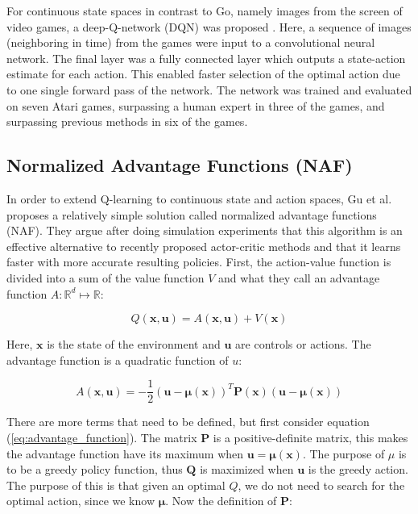 For continuous state spaces in contrast to Go, namely images from the screen of
video games, a deep-Q-network (DQN) was proposed \cite{mnih2013playing}. Here,
a sequence of images (neighboring in time) from the games were input to a
convolutional neural network. The final layer was a fully connected layer which
outputs a state-action estimate for each action. This enabled faster selection
of the optimal action due to one single forward pass of the network. The
network was trained and evaluated on seven Atari games, surpassing a human
expert in three of the games, and surpassing previous methods in six of the
games.


\subsection{Normalized Advantage Functions (NAF)}

In order to extend Q-learning to continuous state and action spaces, Gu et al.
\cite{gu2016continuous} proposes a relatively simple solution called normalized
advantage functions (NAF). They argue after doing simulation experiments that
this algorithm is an effective alternative to recently proposed actor-critic
methods and that it learns faster with more accurate resulting policies. First,
the action-value function is divided into a sum of the value function $V$ and
what they call an advantage function $A : \mathbb{R}^d \longmapsto \mathbb{R}$:

\begin{equation}
    Q(\mathbf{x}, \mathbf{u}) = A(\mathbf{x}, \mathbf{u}) + V(\mathbf{x})
\end{equation}

Here, $\mathbf{x}$ is the state of the environment and $\mathbf{u}$ are
controls or actions. The advantage function is a quadratic function of $u$:

\begin{equation}
    A(\mathbf{x}, \mathbf{u}) = -\frac{1}{2}(\mathbf{u} - \mathbf{\mu(x)})^T\mathbf{P(x)}(\mathbf{u} - \mathbf{\mu(x)})
    \label{eq:advantage_function}
\end{equation}

There are more terms that need to be defined, but first consider equation
(\ref{eq:advantage_function}). The matrix $\mathbf{P}$ is a positive-definite
matrix, this makes the advantage function have its maximum when $\mathbf{u =
\mu(x)}$.  The purpose of $\mu$ is to be a greedy policy function, thus
$\mathbf{Q}$ is maximized when $\mathbf{u}$ is the greedy action. The purpose
of this is that given an optimal $Q$, we do not need to search for the optimal
action, since we know $\mathbf{\mu}$. Now the definition of $\mathbf{P}$:

